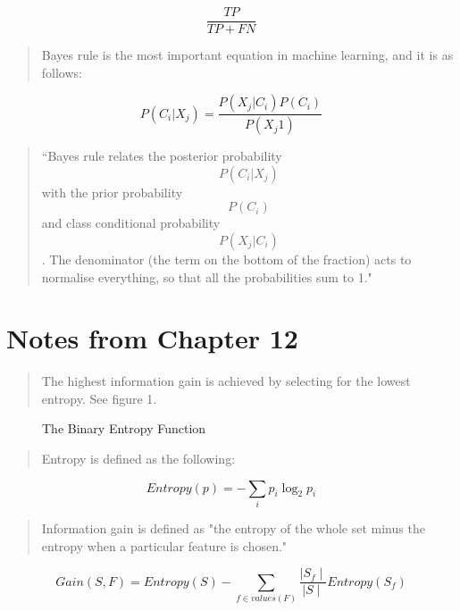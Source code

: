 \documentclass[12pt]{article}
\begin{document}
\begin{equation}
\frac{TP}{TP + FN}
\end{equation}

\begin{verse}
Bayes rule is the most important equation in machine learning, and it is as follows:
\end{verse}

\begin{equation}
P(C_i|X_j) = \frac{P(X_j|C_i)P(C_i)}{P(X_j1)}
\end{equation}

\begin{verse}
``Bayes rule relates the posterior probability $$P(C_i|X_j)$$ with the prior 
probability $$P(C_i)$$ and class conditional probability $$P(X_j|C_i)$$. The denominator (the term on the bottom of the fraction) acts to normalise everything, so that all the probabilities sum to 1."
\end{verse}

\section{Notes from Chapter 12}
\begin{verse}
The highest information gain is achieved by selecting for the lowest entropy. See figure 1.
\end{verse}

\begin{figure}
\centering
{}
\caption{The Binary Entropy Function} \label{fig:M1}
\end{figure}

\begin{verse}
Entropy is defined as the following:
\end{verse}

\begin{equation}
Entropy(p) = -\sum_i{p_i\log_2{p_i}}
\end{equation}

\begin{verse}
Information gain is defined as "the entropy of the whole set minus the entropy when a particular feature is chosen."
\end{verse}

\begin{equation}
Gain(S,F)=Entropy(S) -\sum_{f\in values(F)}{\frac{\mid S_f \mid}{\mid S \mid}Entropy(S_f)}
\end{equation}
\end{document}
